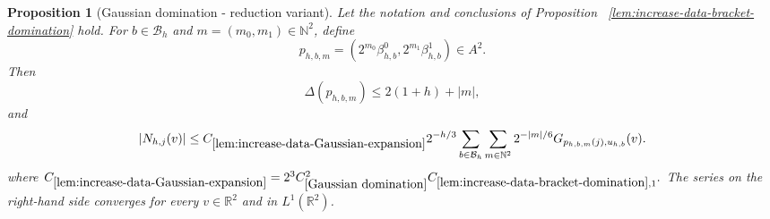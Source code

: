 \documentclass[12pt,reqno]{amsart}
\theoremstyle{plain}
\newtheorem{proposition}[theorem]{Proposition}
\numberwithin{equation}{section}
\theoremstyle{remark}
\newcommand{\using}[1]{}
\begin{document}
\begin{proposition}[Gaussian domination - reduction variant]
\label{lem:increase-data-Gaussian-expansion}\using{Gaussian domination}\using{lem:increase-data-bracket-domination}\using{Operations on spaced sequences}\using{Properties of distance of sequences}
Let the notation and conclusions of Proposition~
\ref{lem:increase-data-bracket-domination} hold. For
\(b\in\mathcal B_h\) and
\(m=(m_0,m_1)\in\mathbb N^2\), define
\begin{equation}\label{auto:Gaussian-domination-rescaled-pairs}
p_{h,b,m}
=
\left(
2^{m_0}\beta_{h,b}^0,
2^{m_1}\beta_{h,b}^1
\right)\in A^2.
\end{equation}
Then
\begin{equation}
    \label{E:increase-data-p-distance}
    \Delta(p_{h,b,m})
    \leq
    2(1+h)
    +
    |m|,
\end{equation}
and
\begin{equation}
    \label{E:increase-data-Gaussian-majorant}
    |N_{h,j}(v)| \leq C_{\ref{lem:increase-data-Gaussian-expansion}} 2^{-h/3} \sum_{b\in\mathcal B_h} \sum_{m\in\mathbb N^2} 2^{-|m|/6} G_{p_{h,b,m}(j),u_{h,b}}(v).
\end{equation}
where $ C_{\ref{lem:increase-data-Gaussian-expansion}}
    =
    2^3C_{\ref{Gaussian domination}}^2C_{\ref{lem:increase-data-bracket-domination},1}.$
The   series on the right-hand side converges for every
\(v\in\mathbb R^2\) and in \(L^1(\mathbb R^2)\).
\end{proposition}
\end{document}
